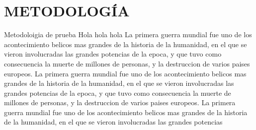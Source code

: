 \section{\small METODOLOGÍA}

Metodoloigia de prueba
Hola hola hola La primera guerra mundial fue uno de los acontecimiento belicos mas grandes 
de la historia de la humanidad, en el que se vieron involucradas las grandes potencias de la 
epoca, y que tuvo como consecuencia la muerte de millones de personas, y la destruccion de
varios paises europeos. La primera guerra mundial fue uno de los acontecimiento belicos mas
grandes de la historia de la humanidad, en el que se vieron involucradas las grandes potencias
de la epoca, y que tuvo como consecuencia la muerte de millones de personas, y la destruccion
de varios paises europeos. La primera guerra mundial fue uno de los acontecimiento belicos mas
grandes de la historia de la humanidad, en el que se vieron involucradas las grandes potencias